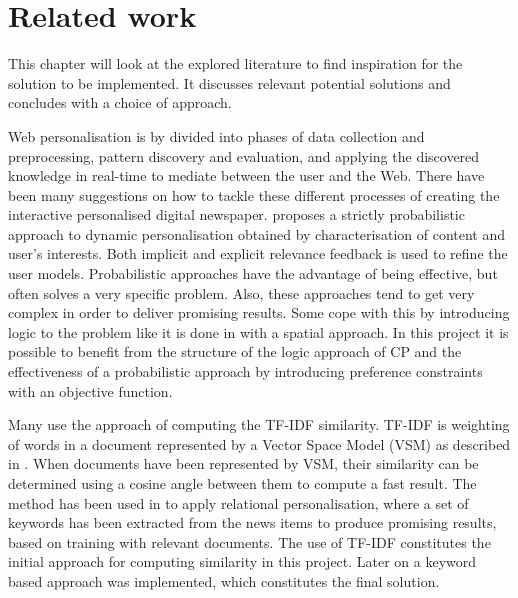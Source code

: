 \chapter{Related work}
\label{ch:related_work}
This chapter will look at the explored literature to find inspiration for the solution to be implemented. It discusses relevant potential solutions and concludes with a choice of approach.

Web personalisation is by \cite{DataMiningMobasher} divided into phases of data collection and preprocessing, pattern discovery and evaluation, and applying the discovered knowledge in real-time to mediate between the user and the Web. There have been many suggestions on how to tackle these different processes of creating the interactive personalised digital newspaper. \cite{gervasum2001ws.pdf} proposes a strictly probabilistic approach to dynamic personalisation obtained by characterisation of content and user's interests. Both implicit and explicit relevance feedback is used to refine the user models. Probabilistic approaches have the advantage of being effective, but often solves a very specific problem. Also, these approaches tend to get very complex in order to deliver promising results. Some cope with this by introducing logic to the problem like it is done in \cite{SpacialLogicNilsson} with a spatial approach. In this project it is possible to benefit from the structure of the logic approach of CP and the effectiveness of a probabilistic approach by introducing preference constraints with an objective function.

Many use the approach of computing the TF-IDF similarity. TF-IDF is weighting of words in a document represented by a Vector Space Model (VSM) as described in \cite{a-vector-space-model-for-automatic-indexing.pdf}. When documents have been represented by VSM, their similarity can be determined using a cosine angle between them to compute a fast result. The method has been used in \cite{fulltext.pdf} to apply relational personalisation, where a set of keywords has been extracted from the news items to produce promising results, based on training with relevant documents. The use of TF-IDF constitutes the initial approach for computing similarity in this project. Later on a keyword based approach was implemented, which constitutes the final solution.

